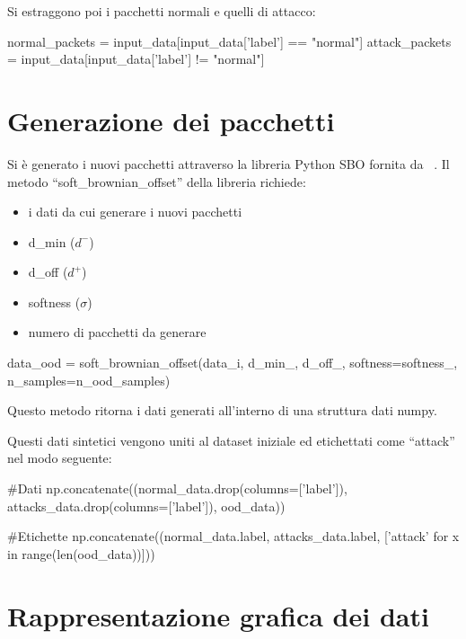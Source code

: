 Si estraggono poi i pacchetti normali e quelli di attacco:

\begin{python}
normal_packets = input_data[input_data['label'] == "normal"]
attack_packets = input_data[input_data['label'] != "normal"]
\end{python}


\section{Generazione dei pacchetti}

Si è generato i nuovi pacchetti attraverso la libreria Python SBO fornita da ~\cite{sbo}. Il metodo ``soft\_brownian\_offset'' della libreria richiede:

\begin{itemize}
    \item i dati da cui generare i nuovi pacchetti
    \item d\_min ($d^{-}$)
    \item d\_off ($d^{+}$)
    \item softness ($\sigma$)
    \item numero di pacchetti da generare
\end{itemize}

\begin{python}
data_ood = soft_brownian_offset(data_i, d_min_, d_off_,
                                    softness=softness_,
                                  n_samples=n_ood_samples)
\end{python}

Questo metodo ritorna i dati generati all'interno di una struttura dati numpy.

Questi dati sintetici vengono uniti al dataset iniziale ed etichettati come ``attack'' nel modo seguente:

\begin{python}
#Dati
np.concatenate((normal_data.drop(columns=['label']), attacks_data.drop(columns=['label']), ood_data))

#Etichette
np.concatenate((normal_data.label, attacks_data.label, ['attack' for x in range(len(ood_data))]))
\end{python}



\section{Rappresentazione grafica dei dati}
 
